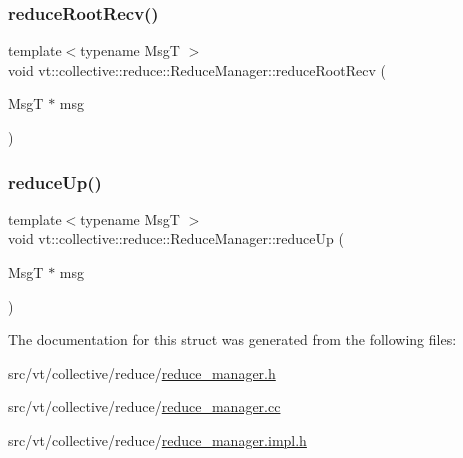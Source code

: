 \mbox{\label{structvt_1_1collective_1_1reduce_1_1_reduce_manager_a7ee21e635c585acc7d7339911a0900eb}} 
\subsubsection{\texorpdfstring{reduce\+Root\+Recv()}{reduceRootRecv()}}
{\footnotesize\ttfamily template$<$typename MsgT $>$ \\
void vt\+::collective\+::reduce\+::\+Reduce\+Manager\+::reduce\+Root\+Recv (\begin{DoxyParamCaption}\item[{MsgT $\ast$}]{msg }\end{DoxyParamCaption})\hspace{0.3cm}{\ttfamily [static]}}

\mbox{\label{structvt_1_1collective_1_1reduce_1_1_reduce_manager_a744a70b8e28ef9c58cb9ccdb06493d15}} 
\subsubsection{\texorpdfstring{reduce\+Up()}{reduceUp()}}
{\footnotesize\ttfamily template$<$typename MsgT $>$ \\
void vt\+::collective\+::reduce\+::\+Reduce\+Manager\+::reduce\+Up (\begin{DoxyParamCaption}\item[{MsgT $\ast$}]{msg }\end{DoxyParamCaption})\hspace{0.3cm}{\ttfamily [static]}}



The documentation for this struct was generated from the following files\+:\begin{DoxyCompactItemize}
\item 
src/vt/collective/reduce/\hyperlink{reduce__manager_8h}{reduce\+\_\+manager.\+h}\item 
src/vt/collective/reduce/\hyperlink{reduce__manager_8cc}{reduce\+\_\+manager.\+cc}\item 
src/vt/collective/reduce/\hyperlink{reduce__manager_8impl_8h}{reduce\+\_\+manager.\+impl.\+h}\end{DoxyCompactItemize}
